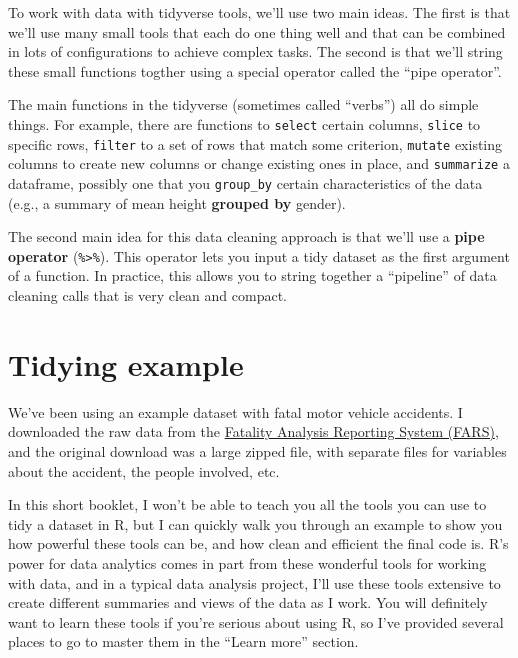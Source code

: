 \documentclass[]{tufte-book}
\begin{document}
To work with data with tidyverse tools, we'll use two main ideas.
The first is that we'll use many small tools that each do one thing well and that
can be combined in lots of configurations to achieve complex tasks. The second is
that we'll string these small functions togther using a special operator
called the ``pipe operator''.

The main functions in the tidyverse (sometimes called ``verbs'') all do simple things.
For example, there are functions to \texttt{select} certain columns, \texttt{slice} to specific
rows, \texttt{filter} to a set of rows that match some criterion, \texttt{mutate} existing columns
to create new columns or change existing ones in place, and \texttt{summarize} a dataframe,
possibly one that you \texttt{group\_by} certain characteristics of the data (e.g., a summary
of mean height \textbf{grouped by} gender).

The second main idea for this data cleaning approach is that we'll use a
\textbf{pipe operator} (\texttt{\%\textgreater{}\%}). This operator lets you input a tidy dataset as the first
argument of a function. In practice, this allows you to string together a ``pipeline'' of
data cleaning calls that is very clean and compact.

\hypertarget{tidying-example}{%
\section{Tidying example}\label{tidying-example}}

We've been using an example dataset with fatal motor vehicle accidents. I downloaded the raw
data from the \href{https://www.nhtsa.gov/research-data/fatality-analysis-reporting-system-fars}{Fatality Analysis Reporting System (FARS)}, and the
original download was a large zipped file, with separate files for variables about the
accident, the people involved, etc.

In this short booklet, I won't be able to teach you all the tools you can use to tidy
a dataset in R, but I can quickly walk you through an example to show you how powerful these
tools can be, and how clean and efficient the final code is. R's power for data analytics
comes in part from these wonderful tools for working with data, and in a typical data analysis
project, I'll use these tools extensive to create different summaries and views of the data
as I work. You will definitely want to learn these tools if you're serious about using R,
so I've provided several places to go to master them in the ``Learn more'' section.
\end{document}
